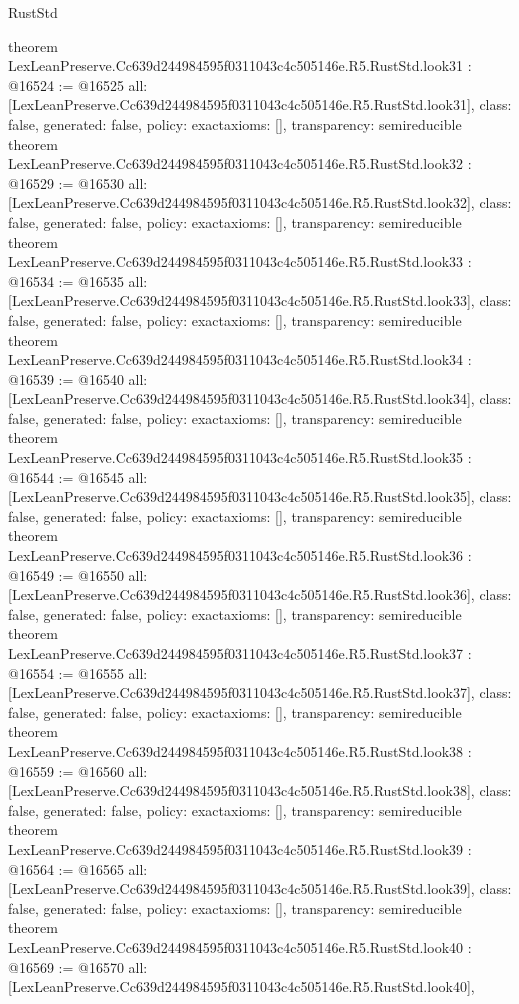 \begin{lexlean}{RustStd}
\begin{coremodule}
{}
theorem LexLeanPreserve.Cc639d244984595f0311043c4c505146e.R5.RustStd.look31 : @16524 := @16525 {
  all: [LexLeanPreserve.Cc639d244984595f0311043c4c505146e.R5.RustStd.look31],
  class: false,
  generated: false,
  policy: exact{axioms: []},
  transparency: semireducible
}
theorem LexLeanPreserve.Cc639d244984595f0311043c4c505146e.R5.RustStd.look32 : @16529 := @16530 {
  all: [LexLeanPreserve.Cc639d244984595f0311043c4c505146e.R5.RustStd.look32],
  class: false,
  generated: false,
  policy: exact{axioms: []},
  transparency: semireducible
}
theorem LexLeanPreserve.Cc639d244984595f0311043c4c505146e.R5.RustStd.look33 : @16534 := @16535 {
  all: [LexLeanPreserve.Cc639d244984595f0311043c4c505146e.R5.RustStd.look33],
  class: false,
  generated: false,
  policy: exact{axioms: []},
  transparency: semireducible
}
theorem LexLeanPreserve.Cc639d244984595f0311043c4c505146e.R5.RustStd.look34 : @16539 := @16540 {
  all: [LexLeanPreserve.Cc639d244984595f0311043c4c505146e.R5.RustStd.look34],
  class: false,
  generated: false,
  policy: exact{axioms: []},
  transparency: semireducible
}
theorem LexLeanPreserve.Cc639d244984595f0311043c4c505146e.R5.RustStd.look35 : @16544 := @16545 {
  all: [LexLeanPreserve.Cc639d244984595f0311043c4c505146e.R5.RustStd.look35],
  class: false,
  generated: false,
  policy: exact{axioms: []},
  transparency: semireducible
}
theorem LexLeanPreserve.Cc639d244984595f0311043c4c505146e.R5.RustStd.look36 : @16549 := @16550 {
  all: [LexLeanPreserve.Cc639d244984595f0311043c4c505146e.R5.RustStd.look36],
  class: false,
  generated: false,
  policy: exact{axioms: []},
  transparency: semireducible
}
theorem LexLeanPreserve.Cc639d244984595f0311043c4c505146e.R5.RustStd.look37 : @16554 := @16555 {
  all: [LexLeanPreserve.Cc639d244984595f0311043c4c505146e.R5.RustStd.look37],
  class: false,
  generated: false,
  policy: exact{axioms: []},
  transparency: semireducible
}
theorem LexLeanPreserve.Cc639d244984595f0311043c4c505146e.R5.RustStd.look38 : @16559 := @16560 {
  all: [LexLeanPreserve.Cc639d244984595f0311043c4c505146e.R5.RustStd.look38],
  class: false,
  generated: false,
  policy: exact{axioms: []},
  transparency: semireducible
}
theorem LexLeanPreserve.Cc639d244984595f0311043c4c505146e.R5.RustStd.look39 : @16564 := @16565 {
  all: [LexLeanPreserve.Cc639d244984595f0311043c4c505146e.R5.RustStd.look39],
  class: false,
  generated: false,
  policy: exact{axioms: []},
  transparency: semireducible
}
theorem LexLeanPreserve.Cc639d244984595f0311043c4c505146e.R5.RustStd.look40 : @16569 := @16570 {
  all: [LexLeanPreserve.Cc639d244984595f0311043c4c505146e.R5.RustStd.look40],
}
\end{coremodule}
\end{lexlean}
